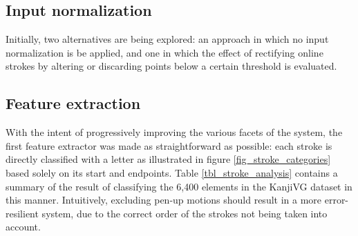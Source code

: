 \documentclass[10pt,conference,a4paper]{IEEEtran}
\begin{document}
	\subsection{Input normalization}

	Initially, two alternatives are being explored: an approach in which no input normalization is be applied, and one 
	in which the effect of rectifying online strokes by altering or discarding points below a certain threshold is evaluated.


	\subsection{Feature extraction}

	With the intent of progressively improving the various facets of the system,
	the first feature extractor was made as straightforward as possible: each stroke is directly
	classified with a letter as illustrated in figure \ref{fig_stroke_categories} based solely
	on its start and endpoints. Table \ref{tbl_stroke_analysis} contains a summary of the
	result of classifying the 6,400 elements in the KanjiVG dataset in this manner.
	Intuitively, excluding pen-up motions should result in a more error-resilient system, due to
	the correct order of the strokes not being taken into account.
\end{document}
